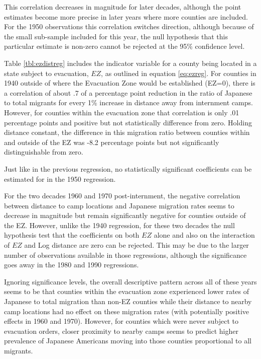\documentclass[12pt]{article}
\begin{document}
This correlation decreases in magnitude for later decades, although the point estimates become more precise in later years where more counties are included.
For the 1950 observations this correlation switches direction, although because of the small sub-sample included for this year, the null hypothesis that this particular estimate is non-zero cannot be rejected at the 95\% confidence level.


Table \ref{tbl:ezdistreg} includes the indicator variable for a county being located in a state subject to evacuation, $EZ$, as outlined in equation \ref{eq:ezreg}.
For counties in 1940 outside of where the Evacuation Zone would be established (EZ=0), there is a correlation of about .7 of a percentage point reduction in the ratio of Japanese to total migrants for every 1\% increase in distance away from internment camps.
However, for counties within the evacuation zone that correlation is only .01 percentage points and positive but not statistically difference from zero.
Holding distance constant, the difference in this migration ratio between counties within and outside of the EZ was -8.2 percentage points but not significantly distinguishable from zero.

Just like in the previous regression, no statistically significant coefficients can be estimated for in the 1950 regression.

For the two decades 1960 and 1970 post-internment, the negative correlation between distance to camp locations and Japanese migration rates seems to decrease in magnitude but remain significantly negative for counties outside of the EZ.
However, unlike the 1940 regression, for these two decades the null hypothesis test that the coefficients on both $EZ$ alone and also on the interaction of $EZ$ and Log distance are zero can be rejected.
This may be due to the larger number of observations available in those regressions, although the significance goes away in the 1980 and 1990 regressions.

Ignoring significance levels, the overall descriptive pattern across all of these years seems to be that counties within the evacuation zone experienced lower rates of Japanese to total migration than non-EZ counties while their distance to nearby camp locations had no effect on these migration rates (with potentially positive effects in 1960 and 1970).
However, for counties which were never subject to evacuation orders, 
closer proximity to nearby camps seems to predict higher prevalence of Japanese Americans moving into those counties proportional to all migrants.
\end{document}
